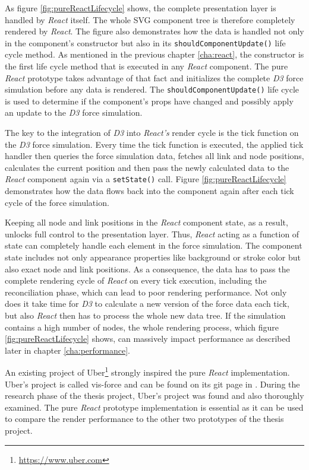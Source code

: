 As figure \ref{fig:pureReactLifecycle} shows, the complete presentation layer is handled by \emph{React} itself. The whole SVG component tree is therefore completely rendered by \emph{React}. The figure also demonstrates how the data is handled not only in the component's constructor but also in its \texttt{shouldComponentUpdate()} life cycle method. As mentioned in the previous chapter \ref{cha:react}, the constructor is the first life cycle method that is executed in any \emph{React} component. The pure \emph{React} prototype takes advantage of that fact and initializes the complete \emph{D3} force simulation before any data is rendered. The \texttt{shouldComponentUpdate()} life cycle is used to determine if the component's props have changed and possibly apply an update to the \emph{D3} force simulation.

The key to the integration of \emph{D3} into \emph{React's} render cycle is the tick function on the \emph{D3} force simulation. Every time the tick function is executed, the applied tick handler then queries the force simulation data, fetches all link and node positions, calculates the current position and then pass the newly calculated data to the \emph{React} component again via a \texttt{setState()} call. Figure \ref{fig:pureReactLifecycle} demonstrates how the data flows back into the component again after each tick cycle of the force simulation.

Keeping all node and link positions in the \emph{React} component state, as a result, unlocks full control to the presentation layer. Thus, \emph{React} acting as a function of state can completely handle each element in the force simulation. The component state includes not only appearance properties like background or stroke color but also exact node and link positions. As a consequence, the data has to pass the complete rendering cycle of \emph{React} on every tick execution, including the reconciliation phase, which can lead to poor rendering performance. Not only does it take time for \emph{D3} to calculate a new version of the force data each tick, but also \emph{React} then has to process the whole new data tree. If the simulation contains a high number of nodes, the whole rendering process, which figure \ref{fig:pureReactLifecycle} shows, can massively impact performance as described later in chapter \ref{cha:performance}.

An existing project of Uber\footnote{\url{https://www.uber.com}} strongly inspired the pure \emph{React} implementation. Uber's project is called vis-force and can be found on its git page in \cite{UberVisForce}. During the research phase of the thesis project, Uber's project was found and also thoroughly examined. The pure \emph{React} prototype implementation is essential as it can be used to compare the render performance to the other two prototypes of the thesis project.

